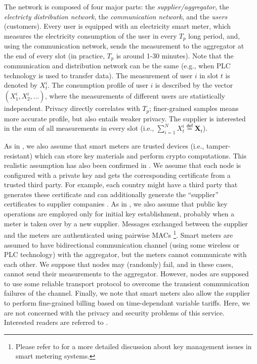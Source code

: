 \documentclass[11pt,a4paper]{article}
\theoremstyle{plain}
\theoremstyle{plain}
\theoremstyle{plain}
\theoremstyle{plain}
\theoremstyle{nonumberplain} \theoremseparator{}
\begin{document}
The network is composed of four major parts: the \emph{supplier/aggregator}, the \emph{electricty distribution network}, the \emph{communication network}, and the \emph{users} (customers). 
Every user is equipped with an electricity smart meter, which measures the electricity consumption of the user in every $T_{p}$ long period, and, using the communication network,  
sends the measurement to the aggregator at the end of every slot (in practice, $T_{p}$ is around 1-30 minutes). Note that the communication and distribution network can be the same (e.g., when PLC technology is used to transfer data). 
The measurement of user $i$ in slot $t$ is denoted by $X_{t}^{i}$. The consumption profile of user $i$ is described by the vector $(X_{1}^{i}, X_{2}^{i},  \ldots)$, where the measurements of different users
are statistically independent.  
Privacy directly correlates with
$T_{p}$; finer-grained samples means more accurate profile, but also entails weaker privacy.
The supplier is interested in the sum of all measurements in every slot (i.e., $\sum_{i=1}^{N}X_{t}^i \stackrel{\mathsf{def}}{=} \mathbf{X}_{t}$). 


As in \cite{bohli10icc}, we also assume that smart meters are trusted devices (i.e., tamper-resistant) which can store key materials and perform crypto computations. This realistic assumption has also been confirmed in \cite{anderson10smartgridcomm}. We assume that each node is configured with a private key and gets the corresponding certificate from a trusted third party. For example, each country might have a third party that generates these certificate and can additionally generate the ``supplier'' certificates to supplier companies \cite{anderson10smartgridcomm}.
As in \cite{anderson10smartgridcomm}, we also assume that public key operations are employed only for initial key establishment, probably when a meter is taken over by a new supplier. Messages exchanged between the supplier and the meters are authenticated using pairwise MACs \footnote{Please refer to \cite{anderson10key} for a more detailed
discussion about key management issues in smart metering systems.}.  Smart meters are assumed to have bidirectional communication channel (using some wireless or PLC technology) with the aggregator, but the meters cannot communicate with each other. 
We suppose that nodes may (randomly) fail, and in these cases, cannot send their measurements to the aggregator. However, nodes are supposed to use some reliable transport protocol to overcome the transient communication failures of the channel. Finally, we note that smart meters also allow the supplier to perform fine-grained billing based on time-dependant variable tariffs. Here, we are not concerned with the privacy and security problems of this service. Interested readers are referred to \cite{danezis10tc,Molina10buildsys}.
 
\end{document}
